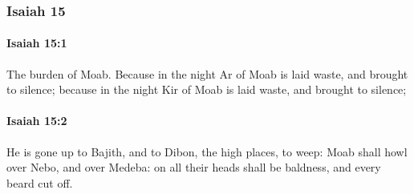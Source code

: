 	\subsubsection{Isaiah 15} %
		\label{ISAIAH-15}

		\paragraph{Isaiah 15:1} %
			\label{ISAIAH-15-1}

			The burden of Moab. Because in the night Ar of Moab is laid waste, and brought to silence; because in the night Kir of Moab is laid waste, and brought to silence;


		\paragraph{Isaiah 15:2} %
			\label{ISAIAH-15-2}

			He is gone up to Bajith, and to Dibon, the high places, to weep: Moab shall howl over Nebo, and over Medeba: on all their heads shall be baldness, and every beard cut off.


